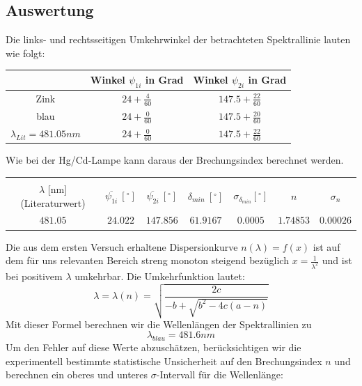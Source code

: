 \documentclass[12pt,a4paper]{article}
\begin{document}
\subsection{Auswertung}
Die links- und rechtsseitigen Umkehrwinkel der betrachteten Spektrallinie lauten wie folgt:
\begin{table}[H]
	\centering
	\begin{tabular}{|c|c|c|}
		\hline
		& Winkel $\psi_{1i}$ in Grad & Winkel $\psi_{2i}$ in Grad\\
		\hline
		Zink&$24+\frac{4}{60}$&$147.5+\frac{22}{60}$\\[0.1cm]
		blau&$24+\frac{0}{60}$&$147.5+\frac{20}{60}$\\[0.1cm]
		$\lambda_{Lit}=481.05nm$&$24+\frac{0}{60}$&$147.5+\frac{22}{60}$\\[0.1cm]
		\hline
	\end{tabular}
	\label{table:Winkel_Rohdaten_Zn}
\end{table}
Wie bei der Hg/Cd-Lampe kann daraus der Brechungsindex berechnet werden.
\begin{table}[H]
	\centering
	\begin{tabular}{|c|c|c|c|c|c|c|}
		\hline
		&&&&&&\\
		$\lambda$ [nm] (Literaturwert)&$\overline{\psi_{1i}}\ [^{\circ}]$&$\overline{\psi_{2i}}\ [^{\circ}]$&$\delta_{min}\ [^{\circ}]$&$\sigma_{\delta_{min}}[^{\circ}]$& $n$ & $\sigma_{n}$\\
		\hline
		$481.05$&$24.022$&$147.856$&$61.9167$&$0.0005$&$1.74853$&$0.00026$\\
		\hline
	\end{tabular}
	\label{table:Zn_Rechnung}
\end{table}
Die aus dem ersten Versuch erhaltene Dispersionkurve $n(\lambda)=f(x)$ ist auf dem für uns relevanten Bereich streng monoton steigend bezüglich $x=\frac{1}{\lambda^2}$ und ist bei positivem $\lambda$ umkehrbar. Die Umkehrfunktion lautet:
\begin{equation}
\lambda=\lambda(n)=\sqrt{\frac{2c}{-b+\sqrt{b^2-4c(a-n)}}}
\end{equation} 
Mit dieser Formel berechnen wir die Wellenlängen der Spektrallinien zu 
\begin{equation}
\lambda_{blau}=481.6nm
\end{equation}
Um den Fehler auf diese Werte abzuschätzen, berücksichtigen wir die experimentell bestimmte statistische Unsicherheit auf den Brechungsindex $n$ und berechnen ein oberes und unteres $\sigma$-Intervall für die Wellenlänge:
\end{document}

